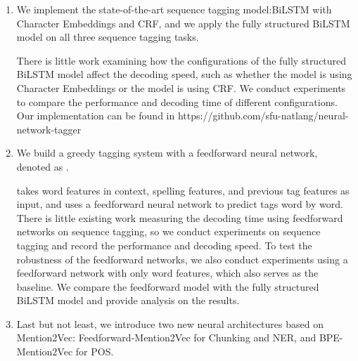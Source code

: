 \begin{enumerate}

\item  We implement the state-of-the-art sequence tagging model:BiLSTM with Character Embeddings and CRF, and we apply the fully structured BiLSTM model on all three sequence tagging tasks.

There is little work examining how the configurations of the fully structured BiLSTM model affect the decoding speed, such as whether the model is using Character Embeddings or the model is using CRF. We conduct experiments to compare the performance and decoding time of different configurations. Our implementation can be found in https://github.com/sfu-natlang/neural-network-tagger

\item We build a greedy tagging system with a feedforward neural network, denoted as \ffa. 

\ffa{} takes word features in context, spelling features, and previous tag features as input, and uses a feedforward neural network to predict tags word by word. There is little existing work measuring the decoding time using feedforward networks on sequence tagging, so we conduct experiments on sequence tagging and record the performance and decoding speed. To test the robustness of the feedforward networks, we also conduct experiments using a feedforward network with only word features, which also serves as the baseline. We compare the  feedforward model with the fully structured BiLSTM model and provide analysis on the results. 


\item Last but not least, we introduce two new neural architectures based on Mention2Vec: Feedforward-Mention2Vec for Chunking and NER, and BPE-Mention2Vec for POS. 


\end{enumerate}
